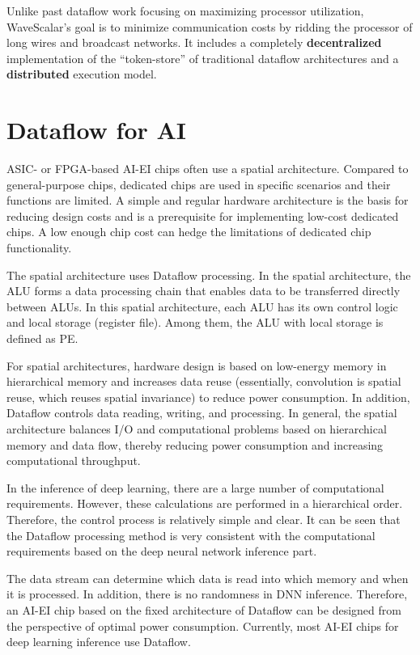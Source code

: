 \documentclass[UTF8,12pt,a4paper]{article}
\begin{document}
Unlike past dataflow work focusing on maximizing processor utilization,
WaveScalar’s goal is to minimize communication costs by ridding the processor of long wires and broadcast networks.
It includes a completely \textbf{decentralized} implementation of the ``token-store'' of traditional dataflow architectures
and a \textbf{distributed} execution model.

\clearpage

\section{Dataflow for AI}

ASIC- or FPGA-based AI-EI chips often use a spatial architecture.
Compared to general-purpose chips, dedicated chips are used
in specific scenarios and their functions are limited.
A simple and regular hardware architecture is the basis for reducing design costs
and is a prerequisite for implementing low-cost dedicated chips.
A low enough chip cost can hedge the limitations of dedicated chip functionality.

The spatial architecture uses Dataflow processing.
In the spatial architecture, the ALU forms a data processing chain
that enables data to be transferred directly between ALUs.
In this spatial architecture, each ALU has its own control logic and local storage (register file).
Among them, the ALU with local storage is defined as PE.

For spatial architectures, hardware design is based on
low-energy memory in hierarchical memory and increases data reuse
(essentially, convolution is spatial reuse, which reuses spatial invariance) to reduce power consumption.
In addition, Dataflow controls data reading, writing, and processing.
In general, the spatial architecture balances I/O and computational problems
based on hierarchical memory and data flow,
thereby reducing power consumption and increasing computational throughput.

In the inference of deep learning, there are a large number of computational requirements.
However, these calculations are performed in a hierarchical order.
Therefore, the control process is relatively simple and clear.
It can be seen that the Dataflow processing method is very consistent
with the computational requirements based on the deep neural network inference part.

The data stream can determine which data is read into which memory and when it is processed.
In addition, there is no randomness in DNN inference.
Therefore, an AI-EI chip based on the fixed architecture of Dataflow
can be designed from the perspective of optimal power consumption.
Currently, most AI-EI chips for deep learning inference use Dataflow.
\end{document}
